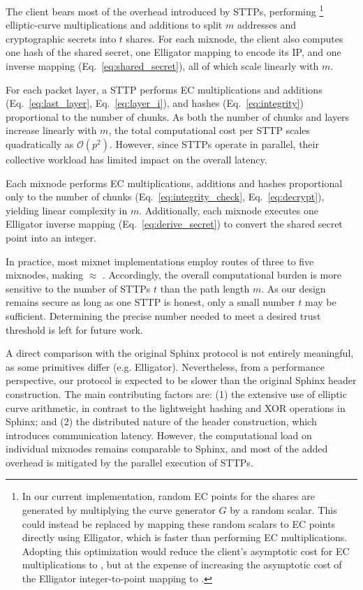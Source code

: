 The client bears most of the overhead introduced by STTPs, performing 
\footnote{\label{cnote}
    In our current implementation, random EC points for the shares are generated by multiplying the curve generator $G$ by a random scalar.  
    This could instead be replaced by mapping these random scalars to EC points directly using Elligator, which is faster than performing EC multiplications.
    Adopting this optimization would reduce the client's asymptotic cost for EC multiplications to ,  
    but at the expense of increasing the asymptotic cost of the Elligator integer-to-point mapping to .
}
elliptic-curve multiplications and additions to split $m$ addresses and cryptographic secrets into $t$ shares.  
For each mixnode, the client also computes one hash of the shared secret, one Elligator mapping to encode its IP, and one inverse mapping (Eq.~\ref{eq:shared_secret}), all of which scale linearly with $m$.

For each packet layer, a STTP performs EC multiplications and additions (Eq.~\ref{eq:last_layer}, Eq.~\ref{eq:layer_i}), and hashes (Eq.~\ref{eq:integrity}) proportional to the number of chunks.  
As both the number of chunks and layers increase linearly with $m$, the total computational cost per STTP scales quadratically as $\mathcal{O}(p^2)$.  
However, since STTPs operate in parallel, their collective workload has limited impact on the overall latency.

Each mixnode performs EC multiplications, additions and hashes proportional only to the number of chunks (Eq.~\ref{eq:integrity_check}, Eq.~\ref{eq:decrypt}), yielding linear complexity in $m$.  
Additionally, each mixnode executes one Elligator inverse mapping (Eq.~\ref{eq:derive_secret}) to convert the shared secret point into an integer.


In practice, most mixnet implementations employ routes of three to five mixnodes, making  $\approx$ .
Accordingly, the overall computational burden is more sensitive to the number of STTPs $t$ than the path length $m$.
As our design remains secure as long as one STTP is honest, only a small number $t$ may be sufficient.
Determining the precise number needed to meet a desired trust threshold is left for future work.
\newline


A direct comparison with the original Sphinx protocol is not entirely meaningful, as some primitives differ (e.g. Elligator).  
Nevertheless, from a performance perspective, our protocol is expected to be slower than the original Sphinx header construction.  
The main contributing factors are: (1) the extensive use of elliptic curve arithmetic, in contrast to the lightweight hashing and XOR operations in Sphinx; and (2) the distributed nature of the header construction, which introduces communication latency.  
However, the computational load on individual mixnodes remains comparable to Sphinx, and most of the added overhead is mitigated by the parallel execution of STTPs.  

